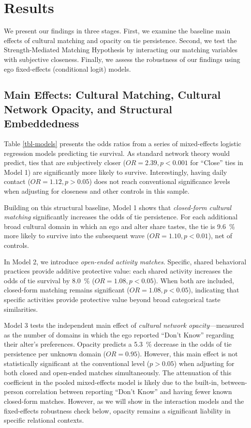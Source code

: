 \documentclass[
  letterpaper,
  DIV=11,
  numbers=noendperiod]{scrartcl}
\def\percent{\%}%
\begin{document}
\section{Results}\label{results}

We present our findings in three stages. First, we examine the baseline main effects of cultural matching and opacity on tie persistence. Second, we test the Strength-Mediated Matching Hypothesis by interacting our matching variables with subjective closeness. Finally, we assess the robustness of our findings using ego fixed-effects (conditional logit) models.

\subsection{Main Effects: Cultural Matching, Cultural Network Opacity, and Structural Embeddedness}

Table \ref{tbl-models} presents the odds ratios from a series of mixed-effects logistic regression models predicting tie survival. As standard network theory would predict, ties that are subjectively closer ($OR = 2.39, p < 0.001$ for ``Close'' ties in Model 1) are significantly more likely to survive. Interestingly, having daily contact ($OR = 1.12, p > 0.05$) does not reach conventional significance levels when adjusting for closeness and other controls in this sample.

Building on this structural baseline, Model 1 shows that \textit{closed-form cultural matching} significantly increases the odds of tie persistence. For each additional broad cultural domain in which an ego and alter share tastes, the tie is \SI{9.6}{\percent} more likely to survive into the subsequent wave ($OR = 1.10, p < 0.01$), net of controls.

In Model 2, we introduce \textit{open-ended activity matches}. Specific, shared behavioral practices provide additive protective value: each shared activity increases the odds of tie survival by \SI{8.0}{\percent} ($OR = 1.08, p < 0.05$). When both are included, closed-form matching remains significant ($OR = 1.08, p < 0.05$), indicating that specific activities provide protective value beyond broad categorical taste similarities.

Model 3 tests the independent main effect of \textit{cultural network opacity}---measured as the number of domains in which the ego reported ``Don't Know'' regarding their alter's preferences. Opacity predicts a \SI{5.3}{\percent} decrease in the odds of tie persistence per unknown domain ($OR = 0.95$). However, this main effect is not statistically significant at the conventional level ($p > 0.05$) when adjusting for both closed and open-ended matches simultaneously. The attenuation of this coefficient in the pooled mixed-effects model is likely due to the built-in, between-person correlation between reporting ``Don't Know'' and having fewer known closed-form matches. However, as we will show in the interaction models and the fixed-effects robustness check below, opacity remains a significant liability in specific relational contexts.
\end{document}
